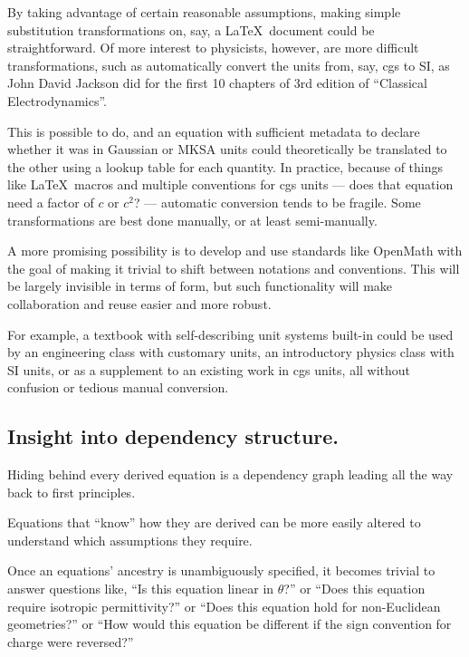 \documentclass[12pt,letterpaper]{article}
\begin{document}
By taking advantage of certain reasonable assumptions,
making simple substitution transformations on, say,
a \LaTeX\ document could be straightforward.
Of more interest to physicists, however,
are more difficult transformations,
such as automatically convert the units from,
say, cgs to SI,
as John David Jackson did for the first 10 chapters of 3rd edition of ``Classical Electrodynamics''.

This is possible to do,
and an equation with sufficient metadata to declare whether it was in Gaussian or MKSA units
could theoretically be translated to the other using a lookup table for each quantity.
In practice,
because of things like \LaTeX\ macros and multiple conventions for cgs units
--- does that equation need a factor of $c$ or $c^2$? ---
automatic conversion tends to be fragile.
Some transformations are best done manually,
or at least semi-manually.


A more promising possibility is to develop and use standards like OpenMath
with the goal of making it trivial to shift between notations and conventions.
This will be largely invisible in terms of form,
but such functionality will make collaboration and reuse easier and more robust.

For example,
a textbook with self-describing unit systems built-in could be used by
an engineering class with customary units,
an introductory physics class with SI units,
or as a supplement to an existing work in cgs units,
all without confusion or tedious manual conversion.

\subsection{Insight into dependency structure.}

Hiding behind every derived equation is a dependency graph leading all the way back to first principles.

Equations that ``know'' how they are derived can be more easily altered to understand which assumptions they require.

Once an equations' ancestry is unambiguously specified,
it becomes trivial to answer questions like,
``Is this equation linear in $\theta$?''
or
``Does this equation require isotropic permittivity?''
or
``Does this equation hold for non-Euclidean geometries?''
or
``How would this equation be different if the sign convention for charge were reversed?''
\end{document}

